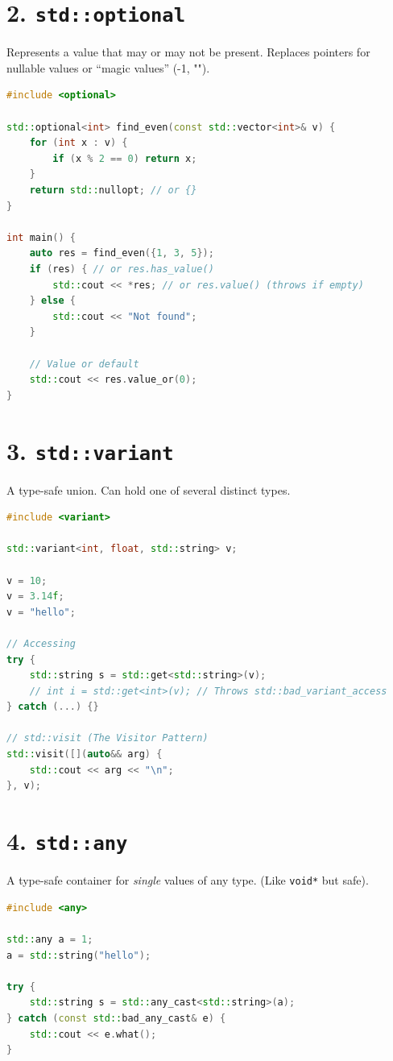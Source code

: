 \hypertarget{stdoptional}{%
\section{\texorpdfstring{2.
\texttt{std::optional}}{2. std::optional}}\label{stdoptional}}

Represents a value that may or may not be present. Replaces pointers for
nullable values or ``magic values'' (-1, "").

\begin{lstlisting}[language={C++}]
#include <optional>

std::optional<int> find_even(const std::vector<int>& v) {
    for (int x : v) {
        if (x % 2 == 0) return x;
    }
    return std::nullopt; // or {}
}

int main() {
    auto res = find_even({1, 3, 5});
    if (res) { // or res.has_value()
        std::cout << *res; // or res.value() (throws if empty)
    } else {
        std::cout << "Not found";
    }
    
    // Value or default
    std::cout << res.value_or(0); 
}
\end{lstlisting}

\hypertarget{stdvariant}{%
\section{\texorpdfstring{3.
\texttt{std::variant}}{3. std::variant}}\label{stdvariant}}

A type-safe union. Can hold one of several distinct types.

\begin{lstlisting}[language={C++}]
#include <variant>

std::variant<int, float, std::string> v;

v = 10;
v = 3.14f;
v = "hello";

// Accessing
try {
    std::string s = std::get<std::string>(v);
    // int i = std::get<int>(v); // Throws std::bad_variant_access
} catch (...) {}

// std::visit (The Visitor Pattern)
std::visit([](auto&& arg) {
    std::cout << arg << "\n";
}, v);
\end{lstlisting}

\hypertarget{stdany}{%
\section{\texorpdfstring{4.
\texttt{std::any}}{4. std::any}}\label{stdany}}

A type-safe container for \emph{single} values of any type. (Like
\passthrough{\lstinline!void*!} but safe).

\begin{lstlisting}[language={C++}]
#include <any>

std::any a = 1;
a = std::string("hello");

try {
    std::string s = std::any_cast<std::string>(a);
} catch (const std::bad_any_cast& e) {
    std::cout << e.what();
}
\end{lstlisting}
